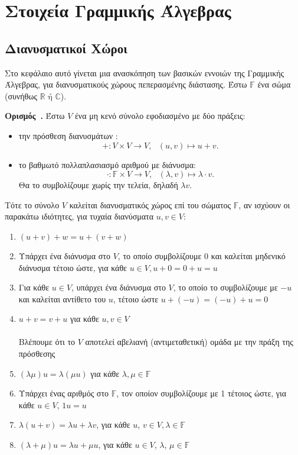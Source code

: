 \documentclass[12pt, a4paper]{book}
\newcounter{definition}[section]
\newenvironment{definition}[1][]{\refstepcounter{definition}\par\medskip
   \textbf{Ορισμός~\thedefinition. #1} \rmfamily}{\medskip}
\begin{document}
\section{Στοιχεία Γραμμικής Άλγεβρας}

\subsection{Διανυσματικοί Χώροι}

Στο κεφάλαιο αυτό γίνεται μια ανασκόπηση των βασικών εννοιών της Γραμμικής Άλγεβρας, για διανυσματικούς χώρους πεπερασμένης διάστασης. Έστω $\mathbb{F}$ ένα σώμα (συνήθως $\mathbb{R} \text{ ή } \mathbb{C}$).

\begin{definition}
Έστω $V$ ένα μη κενό σύνολο εφοδιασμένο με δύο πράξεις: 
\begin{itemize}
\item την πρόσθεση διανυσμάτων :
\begin{displaymath}
+ : V \times V \rightarrow V, \text{ } (u,v) \mapsto u+v.
\end{displaymath}
\item 	το βαθμωτό πολλαπλασιασμό αριθμού με διάνυσμα:
\begin{displaymath}
\cdot : \mathbb{F}\times V \rightarrow V, \text{ } (λ,v) \mapsto λ \cdot v .
\end{displaymath}
Θα το συμβολίζουμε χωρίς την τελεία, δηλαδή $λv$.
\end{itemize}

Τότε το σύνολο $V$ καλείται διανυσματικός χώρος επί του σώματος $\mathbb{F}$, αν ισχύουν οι παρακάτω ιδιότητες, για τυχαία διανύσματα $u,v \in V$:
\begin{enumerate}
\item $(u+v)+w=u+(v+w)$
\item 	Υπάρχει ένα διάνυσμα στο $V$, το οποίο συμβολίζουμε 0 και καλείται μηδενικό διάνυσμα τέτοιο ώστε, για κάθε $u \in V,u+0=0+u=u$
\item 	Για κάθε $u \in V$, υπάρχει ένα διάνυσμα στο $V$, το οποίο το συμβολίζουμε με $-u$ και καλείται αντίθετο του $u$, τέτοιο ώστε $u+(-u)=(-u)+u=0$
\item 	$u+v=v+u$ για κάθε $u,v \in V$ \\ \\
Βλέπουμε ότι το $V$ αποτελεί αβελιανή (αντιμεταθετική) ομάδα με την πράξη της πρόσθεσης
\item 	$(λμ)u=λ(μu)$ για κάθε $λ, μ \in \mathbb{F}$
\item 	Υπάρχει ένας αριθμός στο $\mathbb{F}$, τον οποίον συμβολίζουμε με 1 τέτοιος ώστε, για κάθε $u \in V$, $1u=u$
\item 	$λ(u+v)=λu+λv$, για κάθε $u$, $v \in V,λ \in \mathbb{F}$
\item 	$(λ+μ)u=λu+μu$, για κάθε $u \in V$, $λ$, $μ \in \mathbb{F}$ 
\end{enumerate}
\end{definition}
\end{document}
